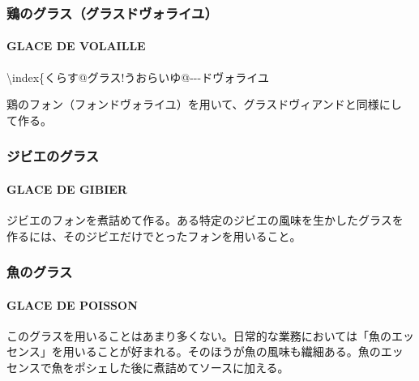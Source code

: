 \begin{recette}
\maeaki

\hypertarget{ux9d8fux306eux30b0ux30e9ux30b9ux30b0ux30e9ux30b9ux30c9ux30f4ux30a9ux30e9ux30a4ux30e6}{%
\subsubsection{鶏のグラス（グラスドヴォライユ）}\label{ux9d8fux306eux30b0ux30e9ux30b9ux30b0ux30e9ux30b9ux30c9ux30f4ux30a9ux30e9ux30a4ux30e6}}

\hypertarget{glace-de-volaille}{%
\paragraph{GLACE DE VOLAILLE}\label{glace-de-volaille}}

\textbackslash{}index\{くらす@グラス!うおらいゆ@-\/-\/-ドヴォライユ

鶏のフォン（フォンドヴォライユ）を用いて、グラスドヴィアンドと同様にし
て作る。

\maeaki

\hypertarget{ux30b8ux30d3ux30a8ux306eux30b0ux30e9ux30b9}{%
\subsubsection{ジビエのグラス}\label{ux30b8ux30d3ux30a8ux306eux30b0ux30e9ux30b9}}

\hypertarget{glace-de-gibier}{%
\paragraph{GLACE DE GIBIER}\label{glace-de-gibier}}


ジビエのフォンを煮詰めて作る。ある特定のジビエの風味を生かしたグラスを
作るには、そのジビエだけでとったフォンを用いること。

\maeaki

\hypertarget{ux9b5aux306eux30b0ux30e9ux30b9}{%
\subsubsection{魚のグラス}\label{ux9b5aux306eux30b0ux30e9ux30b9}}

\hypertarget{glace-de-poisson}{%
\paragraph{GLACE DE POISSON}\label{glace-de-poisson}}


このグラスを用いることはあまり多くない。日常的な業務においては「魚のエッ
センス」を用いることが好まれる。そのほうが魚の風味も繊細ある。魚のエッ
センスで魚をポシェした後に煮詰めてソースに加える。
\end{recette}
\newpage

